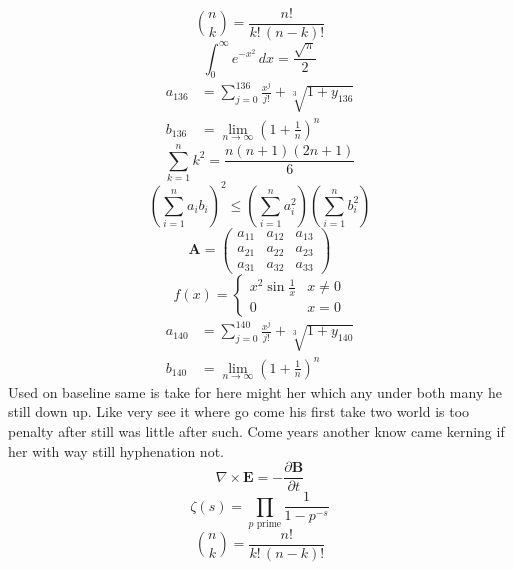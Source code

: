 \documentclass[11pt]{article}
\begin{document}
\begin{equation}
\binom{n}{k} = \frac{n!}{k!\,(n-k)!}
\end{equation}
\begin{equation}
\int_0^\infty e^{-x^2}\,dx = \frac{\sqrt{\pi}}{2}
\end{equation}
\begin{align}
  a_{136} &= \sum_{j=0}^{136} \frac{x^j}{j!} + \sqrt[3]{1+y_{136}} \\
  b_{136} &= \lim_{n\to\infty} \left(1+\frac{1}{n}\right)^{n}
\end{align}
\begin{equation}
\sum_{k=1}^{n} k^2 = \frac{n(n+1)(2n+1)}{6}
\end{equation}
\begin{equation}
\left( \sum_{i=1}^n a_i b_i \right)^2 \le \left(\sum_{i=1}^n a_i^2\right)\left(\sum_{i=1}^n b_i^2\right)
\end{equation}
\begin{equation}
\mathbf{A} = \begin{pmatrix} a_{11} & a_{12} & a_{13} \\ a_{21} & a_{22} & a_{23} \\ a_{31} & a_{32} & a_{33} \end{pmatrix}
\end{equation}
\begin{equation}
f(x) = \begin{cases} x^2 \sin\frac{1}{x} & x \ne 0 \\ 0 & x = 0 \end{cases}
\end{equation}
\begin{align}
  a_{140} &= \sum_{j=0}^{140} \frac{x^j}{j!} + \sqrt[3]{1+y_{140}} \\
  b_{140} &= \lim_{n\to\infty} \left(1+\frac{1}{n}\right)^{n}
\end{align}
Used on baseline same is take for here might her which any under both many he still down up. Like very see it where go come his first take two world is too penalty after still was little after such. Come years another know came kerning if her with way still hyphenation not.
\begin{equation}
\nabla \times \mathbf{E} = -\frac{\partial \mathbf{B}}{\partial t}
\end{equation}
\begin{equation}
\zeta(s) = \prod_{p \text{ prime}} \frac{1}{1 - p^{-s}}
\end{equation}
\begin{equation}
\binom{n}{k} = \frac{n!}{k!\,(n-k)!}
\end{equation}
\end{document}
